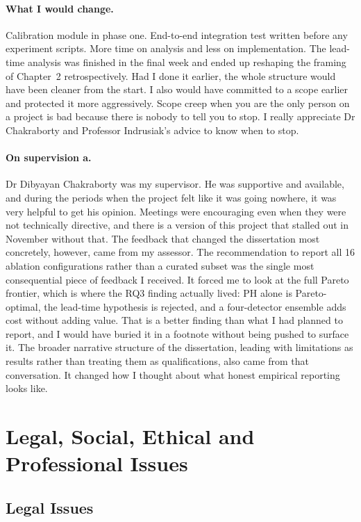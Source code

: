 \begin{appendices}
\paragraph{What I would change.}
Calibration module in phase one. End-to-end integration test written before any 
experiment scripts. More time on analysis and less on implementation. The lead-time 
analysis was finished in the final week and ended up reshaping the framing of Chapter~2 
retrospectively. Had I done it earlier, the whole structure would have been cleaner 
from the start. I also would have committed to a scope earlier and protected it more 
aggressively. Scope creep when you are the only person on a project is bad
because there is nobody to tell you to stop. I really appreciate Dr Chakraborty and Professor Indrusiak's advice to know when to stop. 

\paragraph{On supervision a.}
Dr Dibyayan Chakraborty was my supervisor. He was supportive and available, and during 
the periods when the project felt like it was going nowhere, it was very helpful to get his opinion. Meetings 
were encouraging even when they were not technically directive, and there is a version 
of this project that stalled out in November without that. The feedback that changed 
the dissertation most concretely, however, came from my assessor. The recommendation 
to report all 16 ablation configurations rather than a curated subset was the single 
most consequential piece of feedback I received. It forced me to look at the full 
Pareto frontier, which is where the RQ3 finding actually lived: PH alone is 
Pareto-optimal, the lead-time hypothesis is rejected, and a four-detector ensemble 
adds cost without adding value. That is a better finding than what I had planned to 
report, and I would have buried it in a footnote without being pushed to surface it. 
The broader narrative structure of the dissertation, leading with limitations as 
results rather than treating them as qualifications, also came from that conversation. 
It changed how I thought about what honest empirical reporting looks like.


\section{Legal, Social, Ethical and Professional Issues}
\label{sec:lsep}

\subsection{Legal Issues}
\label{subsec:legal}


\end{appendices}
